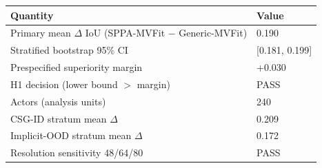 \begin{tabular}{@{}ll@{}}
\toprule
Quantity & Value \\
\midrule
Primary mean $\Delta$ IoU (SPPA-MVFit $-$ Generic-MVFit) & 0.190 \\
Stratified bootstrap 95\% CI & [0.181, 0.199] \\
Prespecified superiority margin & +0.030 \\
H1 decision (lower bound $>$ margin) & PASS \\
Actors (analysis units) & 240 \\
CSG-ID stratum mean $\Delta$ & 0.209 \\
Implicit-OOD stratum mean $\Delta$ & 0.172 \\
Resolution sensitivity 48/64/80 & PASS \\
\bottomrule
\end{tabular}
